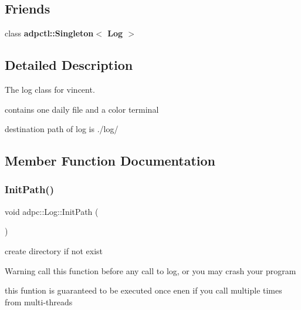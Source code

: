 \subsection*{Friends}
\begin{DoxyCompactItemize}
\item 
\mbox{\label{classadpc_1_1Log_a0e7b4c16064e3789d935b1b3523d78c7}} 
class {\bfseries adpctl\+::\+Singleton$<$ Log $>$}
\end{DoxyCompactItemize}


\subsection{Detailed Description}
The log class for vincent. 

contains one daily file and a color terminal

destination path of log is ./log/ 

\subsection{Member Function Documentation}
\mbox{\label{classadpc_1_1Log_a41b80ba97a00d128777d22f369bc791f}} 
\subsubsection{\texorpdfstring{Init\+Path()}{InitPath()}}
{\footnotesize\ttfamily void adpc\+::\+Log\+::\+Init\+Path (\begin{DoxyParamCaption}{ }\end{DoxyParamCaption})\hspace{0.3cm}{\ttfamily [static]}}



create directory if not exist 

\begin{DoxyWarning}{Warning}
call this function before any call to log, or you may crash your program
\end{DoxyWarning}
this funtion is guaranteed to be executed once enen if you call multiple times from multi-\/threads \mbox{\label{classadpc_1_1Log_ae3e21b4038776f15d0b5ebdfebc41f57}} 
